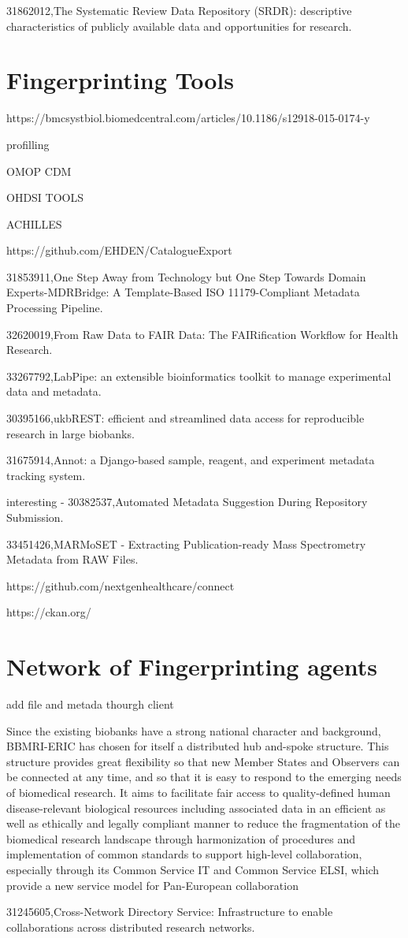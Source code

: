 31862012,The Systematic Review Data Repository (SRDR): descriptive characteristics of publicly available data and opportunities for research.

\section{Fingerprinting Tools}

https://bmcsystbiol.biomedcentral.com/articles/10.1186/s12918-015-0174-y

\cite{maelstrom}

profilling

OMOP CDM

OHDSI TOOLS 

ACHILLES

https://github.com/EHDEN/CatalogueExport

31853911,One Step Away from Technology but One Step Towards Domain Experts-MDRBridge: A Template-Based ISO 11179-Compliant Metadata Processing Pipeline.

32620019,From Raw Data to FAIR Data: The FAIRification Workflow for Health Research.

33267792,LabPipe: an extensible bioinformatics toolkit to manage experimental data and metadata.

30395166,ukbREST: efficient and streamlined data access for reproducible research in large biobanks.

31675914,Annot: a Django-based sample, reagent, and experiment metadata tracking system.

interesting - 30382537,Automated Metadata Suggestion During Repository Submission.

33451426,MARMoSET - Extracting Publication-ready Mass Spectrometry Metadata from RAW Files.

https://github.com/nextgenhealthcare/connect

https://ckan.org/

\section{Network of Fingerprinting agents}
\cite{egenvar}
add file and metada thourgh client

\cite{datasphere}
\cite{ehr4cr}
\cite{popmed}
\cite{gaain}

\cite{bbmieric} Since the existing biobanks have a strong national character and background, BBMRI-ERIC has chosen for itself a distributed hub and-spoke structure. This structure provides great flexibility so that new Member States and Observers can be connected at any time, and so that it is easy to respond to the emerging needs of biomedical research. It aims to facilitate fair access to quality-defined human disease-relevant biological resources including associated data in an efficient as well as ethically and legally compliant manner to reduce the fragmentation of the biomedical research landscape through harmonization of procedures and implementation of common standards to support high-level collaboration, especially through its Common Service IT and Common Service ELSI, which provide a new service model for Pan-European collaboration

31245605,Cross-Network Directory Service: Infrastructure to enable collaborations across distributed research networks.
